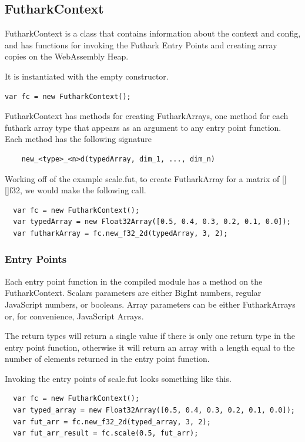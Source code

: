 \documentclass[11pt]{book}
\begin{document}
\subsection*{FutharkContext}

FutharkContext is a class that contains information about the context and config, and has functions for invoking the Futhark Entry Points and creating array copies on the WebAssembly Heap. 

It is instantiated with the empty constructor.

\begin{verbatim}
var fc = new FutharkContext();
\end{verbatim}
 
FutharkContext has methods for creating FutharkArrays, one method for each futhark array type that appears as an argument to any entry point function. Each method has the following signature
\begin{verbatim}
    new_<type>_<n>d(typedArray, dim_1, ..., dim_n) 
\end{verbatim}

Working off of the example scale.fut, to create FutharkArray for a matrix of [][]f32, we would make the following call. 

\begin{verbatim}
  var fc = new FutharkContext();
  var typedArray = new Float32Array([0.5, 0.4, 0.3, 0.2, 0.1, 0.0]);
  var futharkArray = fc.new_f32_2d(typedArray, 3, 2);
\end{verbatim}

\subsubsection*{Entry Points}
Each entry point function in the compiled module has a method on the FutharkContext. Scalars parameters are either BigInt numbers, regular JavaScript numbers, or booleans. Array parameters can be either FutharkArrays or, for convenience, JavaScript Arrays.


The return types will return a single value if there is only one return type in the entry point function, otherwise it will return an array with a length equal to the number of elements returned in the entry point function. 

Invoking the entry points of scale.fut looks something like this.

\begin{verbatim}
  var fc = new FutharkContext();
  var typed_array = new Float32Array([0.5, 0.4, 0.3, 0.2, 0.1, 0.0]);
  var fut_arr = fc.new_f32_2d(typed_array, 3, 2);
  var fut_arr_result = fc.scale(0.5, fut_arr);
\end{verbatim}
\end{document}
